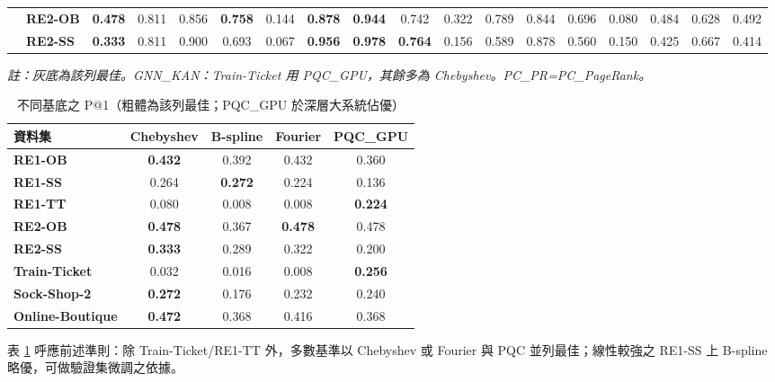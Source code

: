 \documentclass[conference]{IEEEtran}
\begin{document}
\begin{table}[htbp]
\begin{tabular}{ll|cccc|cccc|cccc|cccc}
& \textbf{RE2-OB} & \cellcolor{gray!20}\textbf{0.478} & 0.811 & 0.856 & \cellcolor{gray!20}\textbf{0.758} & 0.144 & \cellcolor{gray!20}\textbf{0.878} & \cellcolor{gray!20}\textbf{0.944} & 0.742 & 0.322 & 0.789 & 0.844 & 0.696 & 0.080 & 0.484 & 0.628 & 0.492 \\
& \textbf{RE2-SS} & \cellcolor{gray!20}\textbf{0.333} & 0.811 & 0.900 & 0.693 & 0.067 & \cellcolor{gray!20}\textbf{0.956} & \cellcolor{gray!20}\textbf{0.978} & \cellcolor{gray!20}\textbf{0.764} & 0.156 & 0.589 & 0.878 & 0.560 & 0.150 & 0.425 & 0.667 & 0.414 \\
\bottomrule
\end{tabular}
\vspace{0.2cm}

\footnotesize \textit{註：灰底為該列最佳。GNN\_KAN：Train-Ticket 用 PQC\_GPU，其餘多為 Chebyshev。PC\_PR=PC\_PageRank。}
\end{table}

\begin{table}[htbp]
\centering
\caption{不同基底之 P@1（粗體為該列最佳；PQC\_GPU 於深層大系統佔優）}
\label{tab:basis_comparison}
\footnotesize
\renewcommand{\arraystretch}{0.85}
\setlength{\tabcolsep}{3pt}
\begin{tabular}{l|cccc}
\toprule
\textbf{資料集} & \textbf{Chebyshev} & \textbf{B-spline} & \textbf{Fourier} & \textbf{PQC\_GPU} \\
\midrule
\textbf{RE1-OB} & \textbf{0.432} & 0.392 & 0.432 & 0.360 \\
\textbf{RE1-SS} & 0.264 & \textbf{0.272} & 0.224 & 0.136 \\
\textbf{RE1-TT} & 0.080 & 0.008 & 0.008 & \textbf{0.224} \\
\midrule
\textbf{RE2-OB} & \textbf{0.478} & 0.367 & \textbf{0.478} & 0.478 \\
\textbf{RE2-SS} & \textbf{0.333} & 0.289 & 0.322 & 0.200 \\
\midrule
\textbf{Train-Ticket} & 0.032 & 0.016 & 0.008 & \textbf{0.256} \\
\textbf{Sock-Shop-2} & \textbf{0.272} & 0.176 & 0.232 & 0.240 \\
\textbf{Online-Boutique} & \textbf{0.472} & 0.368 & 0.416 & 0.368 \\
\bottomrule
\end{tabular}
\end{table}

表 \ref{tab:basis_comparison} 呼應前述準則：除 Train-Ticket/RE1-TT 外，多數基準以 Chebyshev 或 Fourier 與 PQC 並列最佳；線性較強之 RE1-SS 上 B-spline 略優，可做驗證集微調之依據。
\end{document}

